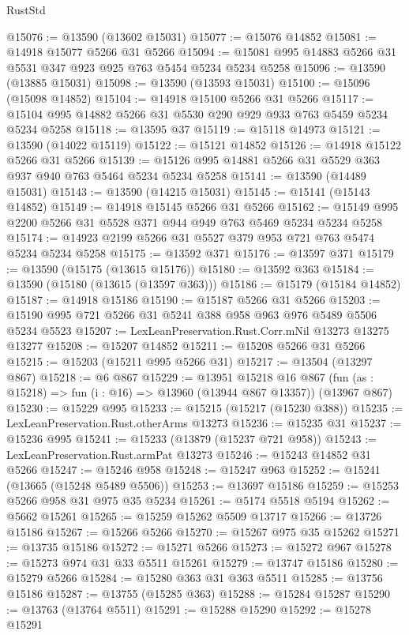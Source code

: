 \begin{lexlean}{RustStd}
\begin{coremodule}
@15076 := @13590 (@13602 @15031)
@15077 := @15076 @14852
@15081 := @14918 @15077 @5266 @31 @5266
@15094 := @15081 @995 @14883 @5266 @31 @5531 @347 @923 @925 @763 @5454 @5234 @5234 @5258
@15096 := @13590 (@13885 @15031)
@15098 := @13590 (@13593 @15031)
@15100 := @15096 (@15098 @14852)
@15104 := @14918 @15100 @5266 @31 @5266
@15117 := @15104 @995 @14882 @5266 @31 @5530 @290 @929 @933 @763 @5459 @5234 @5234 @5258
@15118 := @13595 @37
@15119 := @15118 @14973
@15121 := @13590 (@14022 @15119)
@15122 := @15121 @14852
@15126 := @14918 @15122 @5266 @31 @5266
@15139 := @15126 @995 @14881 @5266 @31 @5529 @363 @937 @940 @763 @5464 @5234 @5234 @5258
@15141 := @13590 (@14489 @15031)
@15143 := @13590 (@14215 @15031)
@15145 := @15141 (@15143 @14852)
@15149 := @14918 @15145 @5266 @31 @5266
@15162 := @15149 @995 @2200 @5266 @31 @5528 @371 @944 @949 @763 @5469 @5234 @5234 @5258
@15174 := @14923 @2199 @5266 @31 @5527 @379 @953 @721 @763 @5474 @5234 @5234 @5258
@15175 := @13592 @371
@15176 := @13597 @371
@15179 := @13590 (@15175 (@13615 @15176))
@15180 := @13592 @363
@15184 := @13590 (@15180 (@13615 (@13597 @363)))
@15186 := @15179 (@15184 @14852)
@15187 := @14918 @15186
@15190 := @15187 @5266 @31 @5266
@15203 := @15190 @995 @721 @5266 @31 @5241 @388 @958 @963 @976 @5489 @5506 @5234 @5523
@15207 := LexLeanPreservation.Rust.Corr.mNil @13273 @13275 @13277
@15208 := @15207 @14852
@15211 := @15208 @5266 @31 @5266
@15215 := @15203 (@15211 @995 @5266 @31)
@15217 := @13504 (@13297 @867)
@15218 := @6 @867
@15229 := @13951
    @15218
    @16
    @867
    (fun (as : @15218) => fun (i : @16) => @13960 (@13944 @867 @13357))
    (@13967 @867)
@15230 := @15229 @995
@15233 := @15215 (@15217 (@15230 @388))
@15235 := LexLeanPreservation.Rust.otherArms @13273
@15236 := @15235 @31
@15237 := @15236 @995
@15241 := @15233 (@13879 (@15237 @721 @958))
@15243 := LexLeanPreservation.Rust.armPat @13273
@15246 := @15243 @14852 @31 @5266
@15247 := @15246 @958
@15248 := @15247 @963
@15252 := @15241 (@13665 (@15248 @5489 @5506))
@15253 := @13697 @15186
@15259 := @15253 @5266 @958 @31 @975 @35 @5234
@15261 := @5174 @5518 @5194
@15262 := @5662 @15261
@15265 := @15259 @15262 @5509 @13717
@15266 := @13726 @15186
@15267 := @15266 @5266
@15270 := @15267 @975 @35 @15262
@15271 := @13735 @15186
@15272 := @15271 @5266
@15273 := @15272 @967
@15278 := @15273 @974 @31 @33 @5511 @15261
@15279 := @13747 @15186
@15280 := @15279 @5266
@15284 := @15280 @363 @31 @363 @5511
@15285 := @13756 @15186
@15287 := @13755 (@15285 @363)
@15288 := @15284 @15287
@15290 := @13763 (@13764 @5511)
@15291 := @15288 @15290
@15292 := @15278 @15291

\end{coremodule}
\end{lexlean}
